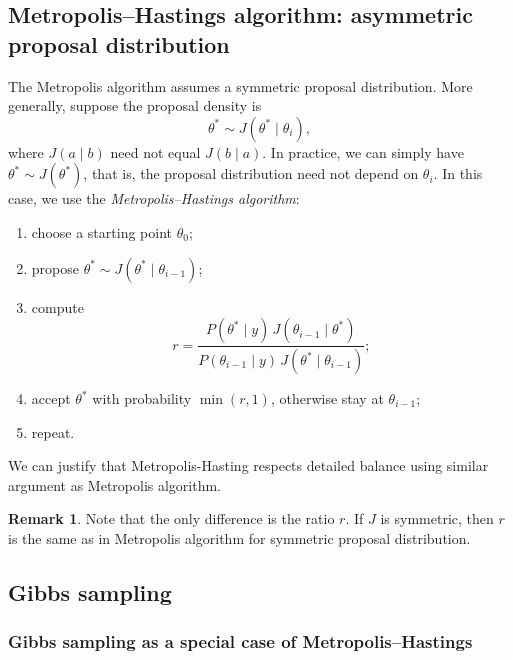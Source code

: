 \documentclass[11pt, titlepage]{article} %
\numberwithin{equation}{section}
\theoremstyle{definition}
\newtheorem{remark}{Remark}
\numberwithin{assumption}{section}
\begin{document}
\subsection{Metropolis--Hastings algorithm: asymmetric proposal distribution}

The Metropolis algorithm assumes a symmetric proposal distribution. More generally, suppose the proposal density is
\begin{equation*}
    \theta^*\sim J(\theta^*\mid \theta_i),
\end{equation*}
where $J(a\mid b)$ need not equal $J(b\mid a)$. In practice, we can simply have $\theta^*\sim J(\theta^*)$, that is, the proposal distribution need not depend on $\theta_i$.
In this case, we use the \textit{Metropolis--Hastings algorithm}:
\begin{enumerate}
    \item choose a starting point $\theta_0$;
    \item propose $\theta^*\sim J(\theta^*\mid \theta_{i-1})$;
    \item compute
    \begin{equation*}
        r=
        \frac{P(\theta^*\mid y)\,J(\theta_{i-1}\mid \theta^*)}
             {P(\theta_{i-1}\mid y)\,J(\theta^*\mid \theta_{i-1})};
    \end{equation*}
    \item accept $\theta^*$ with probability $\min(r,1)$, otherwise stay at $\theta_{i-1}$;
    \item repeat.
\end{enumerate}

We can justify that Metropolis-Hasting respects detailed balance using similar argument as Metropolis algorithm.

\begin{remark}
    Note that the only difference is the ratio $r$. If $J$ is symmetric, then $r$ is the same as in Metropolis algorithm for symmetric proposal distribution. 
\end{remark}


\subsection{Gibbs sampling}

\subsubsection*{Gibbs sampling as a special case of Metropolis--Hastings}
\end{document}
